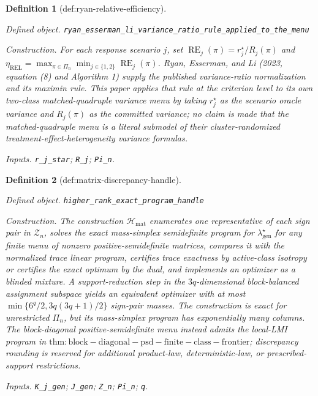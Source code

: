 \documentclass{article}
\newtheorem{definition}{Definition}
\begin{document}
\begin{definition}[def:ryan-relative-efficiency]\label{def:ryan-relative-efficiency}
\par\smallskip\noindent\emph{Defined object.} \texttt{ryan\_\allowbreak{}esserman\_\allowbreak{}li\_\allowbreak{}variance\_\allowbreak{}ratio\_\allowbreak{}rule\_\allowbreak{}applied\_\allowbreak{}to\_\allowbreak{}the\_\allowbreak{}menu}
\par\smallskip\noindent\emph{Construction.} For each response scenario \(j\), set \(\operatorname{RE}_j(\pi)=r_j^\star/R_j(\pi)\) and \(\eta_{\mathrm{REL}}=\max_{\pi\in\Pi_n}\min_{j\in\{1,2\}}\operatorname{RE}_j(\pi)\). Ryan, Esserman, and Li (2023, equation (8) and Algorithm 1) supply the published variance-ratio normalization and its maximin rule. This paper applies that rule at the criterion level to its own two-class matched-quadruple variance menu by taking \(r_j^\star\) as the scenario oracle variance and \(R_j(\pi)\) as the committed variance; no claim is made that the matched-quadruple menu is a literal submodel of their cluster-randomized treatment-effect-heterogeneity variance formulas.
\par\smallskip\noindent\emph{Inputs.} \texttt{r\_\allowbreak{}j\_\allowbreak{}star}; \texttt{R\_\allowbreak{}j}; \texttt{Pi\_\allowbreak{}n}.
\end{definition}

\begin{definition}[def:matrix-discrepancy-handle]\label{def:matrix-discrepancy-handle}
\par\smallskip\noindent\emph{Defined object.} \texttt{higher\_\allowbreak{}rank\_\allowbreak{}exact\_\allowbreak{}program\_\allowbreak{}handle}
\par\smallskip\noindent\emph{Construction.} The construction \(\mathcal H_{\mathrm{mat}}\) enumerates one representative of each sign pair in \(\mathcal Z_n\), solves the exact mass-simplex semidefinite program for \(\lambda_{\mathrm{gen}}^\star\) for any finite menu of nonzero positive-semidefinite matrices, compares it with the normalized trace linear program, certifies trace exactness by active-class isotropy or certifies the exact optimum by the dual, and implements an optimizer as a blinded mixture.  A support-reduction step in the \(3q\)-dimensional block-balanced assignment subspace yields an equivalent optimizer with at most \(\min\{6^q/2,3q(3q+1)/2\}\) sign-pair masses.  The construction is exact for unrestricted \(\Pi_n\), but its mass-simplex program has exponentially many columns.  The block-diagonal positive-semidefinite menu instead admits the local-LMI program in \(\mathrm{thm:block-diagonal-psd-finite-class-frontier}\); discrepancy rounding is reserved for additional product-law, deterministic-law, or prescribed-support restrictions.
\par\smallskip\noindent\emph{Inputs.} \texttt{K\_\allowbreak{}j\_\allowbreak{}gen}; \texttt{J\_\allowbreak{}gen}; \texttt{Z\_\allowbreak{}n}; \texttt{Pi\_\allowbreak{}n}; \texttt{q}.
\end{definition}
\end{document}

